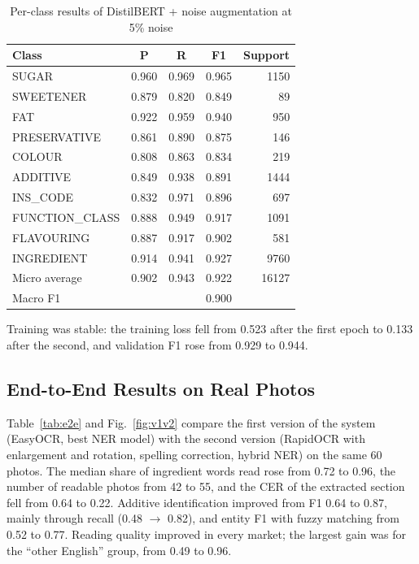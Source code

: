 \documentclass[conference]{IEEEtran}
\begin{document}
\begin{table}[t]
\caption{Per-class results of DistilBERT + noise augmentation at 5\% noise}
\label{tab:perclass}
\centering
\setlength{\tabcolsep}{4pt}
\begin{tabular}{lcccr}
\toprule
Class & P & R & F1 & Support \\
\midrule
SUGAR & 0.960 & 0.969 & 0.965 & 1150 \\
SWEETENER & 0.879 & 0.820 & 0.849 & 89 \\
FAT & 0.922 & 0.959 & 0.940 & 950 \\
PRESERVATIVE & 0.861 & 0.890 & 0.875 & 146 \\
COLOUR & 0.808 & 0.863 & 0.834 & 219 \\
ADDITIVE & 0.849 & 0.938 & 0.891 & 1444 \\
INS\_CODE & 0.832 & 0.971 & 0.896 & 697 \\
FUNCTION\_CLASS & 0.888 & 0.949 & 0.917 & 1091 \\
FLAVOURING & 0.887 & 0.917 & 0.902 & 581 \\
INGREDIENT & 0.914 & 0.941 & 0.927 & 9760 \\
\midrule
Micro average & 0.902 & 0.943 & 0.922 & 16127 \\
Macro F1 & & & 0.900 & \\
\bottomrule
\end{tabular}
\end{table}

Training was stable: the training loss fell from 0.523 after the first epoch to 0.133 after the second, and validation F1 rose from 0.929 to 0.944.

\subsection{End-to-End Results on Real Photos}
Table~\ref{tab:e2e} and Fig.~\ref{fig:v1v2} compare the first version of the system (EasyOCR, best NER model) with the second version (RapidOCR with enlargement and rotation, spelling correction, hybrid NER) on the same 60 photos. The median share of ingredient words read rose from 0.72 to 0.96, the number of readable photos from 42 to 55, and the CER of the extracted section fell from 0.64 to 0.22. Additive identification improved from F1 0.64 to 0.87, mainly through recall (0.48 $\rightarrow$ 0.82), and entity F1 with fuzzy matching from 0.52 to 0.77. Reading quality improved in every market; the largest gain was for the ``other English'' group, from 0.49 to 0.96.
\end{document}
